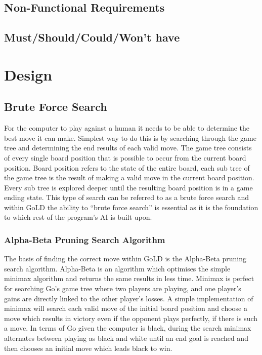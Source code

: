 \documentclass{l4proj}
\begin{document}
\section{Non-Functional Requirements}

\section{Must/Should/Could/Won't have}




\chapter{Design}


\section{Brute Force Search}
For the computer to play against a human it needs to be able to determine the best move it can make. Simplest way to do this is by searching through the game tree and determining the end results of each valid move. The game tree consists of every single board position that is possible to occur from the current board position. Board position refers to the state of the entire board, each sub tree of the game tree is the result of making a valid move in the current board position. Every sub tree is explored deeper until the resulting board position is in a game ending state. This type of search can be referred to as a brute force search and within GoLD the ability to “brute force search” is essential as it is the foundation to which rest of the program’s AI is built upon.

\subsection{Alpha-Beta Pruning Search Algorithm}

The basis of finding the correct move within GoLD is the Alpha-Beta pruning search algorithm. Alpha-Beta is an algorithm which optimises the simple minimax algorithm and returns the same results in less time. Minimax is perfect for searching Go’s game tree where two players are playing, and one player’s gains are directly linked to the other player’s losses. A simple implementation of minimax will search each valid move of the initial board position and choose a move which results in victory even if the opponent plays perfectly, if there is such a move. In terms of Go given the computer is black, during the search minimax alternates between playing as black and white until an end goal is reached and then chooses an initial move which leads black to win.
\end{document}
